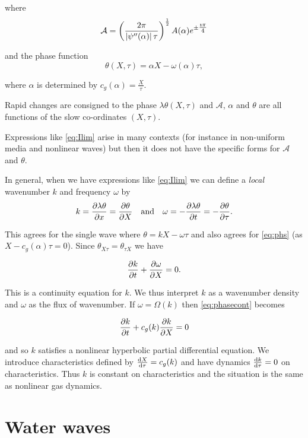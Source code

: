 \documentclass{notes}
\newcommand{\cA}{\mathcal{A}}
\begin{document}
where
\[
\cA = \left( \frac{2 \pi}{ \abs{\psi''(\alpha)} \tau} \right)^{\frac{1}{2}}
A(\alpha) e^{\pm \tfrac{\imath \pi}{4}}
\]

and the phase function
\begin{equation}\label{eq:phs}
\theta(X,\tau) = \alpha X - \omega(\alpha) \tau,
\end{equation}

where $\alpha$ is determined by $c_g(\alpha) = \tfrac{X}{\tau}$.

Rapid changes are consigned to the phase $\lambda \theta(X,\tau)$ and
$\cA$, $\alpha$ and $\theta$ are all functions of the slow co-ordinates
$(X,\tau)$.

Expressions like \eqref{eq:Ilim} arise in many contexts
(for instance in non-uniform media and nonlinear waves) but then
it does not have the specific forms for $\cA$ and $\theta$.

In general, when we have expressions like
\eqref{eq:Ilim} we can define a \emph{local} wavenumber $k$ and frequency
$\omega$ by
\begin{equation}
k = \frac{\partial \lambda \theta}{\partial x} = \frac{\partial \theta}{\partial X} \quad \text{and} \quad
\omega = -\frac{\partial \lambda \theta}{\partial t} = -\frac{\partial \theta}{\partial \tau}.
\end{equation}

This agrees for the single wave where $\theta = k X - \omega \tau$ and
also agrees for \eqref{eq:phs} (as $X - c_g(\alpha) \tau = 0$).
Since $\theta_{X \tau} = \theta_{\tau X}$ we have

\begin{equation}\label{eq:phasecont}
\frac{\partial k}{\partial t} + \frac{\partial \omega}{\partial X} = 0.
\end{equation}

This is a continuity equation for $k$.  We thus interpret $k$ as
a wavenumber density and $\omega$ as the flux of wavenumber.
If $\omega = \Omega(k)$ then \eqref{eq:phasecont} becomes

\[
\frac{\partial k}{\partial t} + c_g(k) \frac{\partial k}{\partial X} = 0
\]

and so $k$ satisfies a nonlinear hyperbolic partial differential equation.
We introduce characteristics defined by $\frac{\mathrm{d} X}{\mathrm{d}\tau} = c_g(k)$
and have dynamics $\frac{\mathrm{d} k}{\mathrm{d}\tau} = 0$ on characteristics.
Thus $k$ is constant on characteristics and the situation is the same as
nonlinear gas dynamics.

\section{Water waves}
\end{document}
